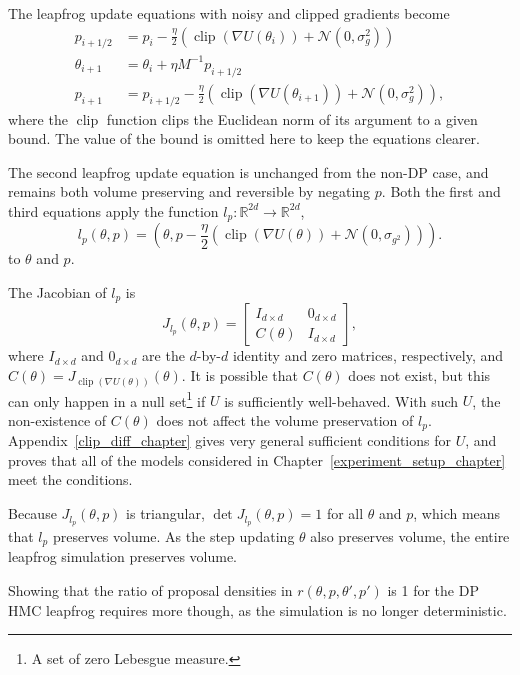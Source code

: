 \documentclass[english,twoside,openright]{HYgraduMLDS}
\newcommand{\R}{\mathbb{R}}
\newcommand{\caln}{{\mathcal{N}}}
\DeclareMathOperator{\clip}{clip}
\begin{document}
The leapfrog update equations with noisy and clipped gradients become
\begin{align*}
  p_{i+1/2} &= p_{i} - \frac{\eta}{2}(\clip(\nabla U(\theta_{i})) + \caln(0, \sigma_{g}^{2})) \\
  \theta_{i+1} &= \theta_{i} + \eta M^{-1}p_{i+1/2} \\
  p_{i+1} &= p_{i+1/2} - \frac{\eta}{2}(\clip(\nabla U(\theta_{i+1})) + \caln(0, \sigma_{g}^{2})),
\end{align*}
where the \(\clip\) function clips the Euclidean norm of its argument to a
given bound. The value of the bound is omitted here to keep the equations
clearer.

The second leapfrog update equation is unchanged from the non-DP case,
and remains both volume preserving and reversible
by negating \(p\). Both the first and third equations apply the function
\(l_{p}\colon \R^{2d}\to \R^{2d}\),
\[
  l_{p}(\theta, p) = \left(\theta, p - \frac{\eta}{2}(\clip(\nabla U(\theta))
    + \caln(0, \sigma_{g^{2}}))\right).
\]
to \(\theta\) and \(p\).

The Jacobian of \(l_{p}\) is
\[
  J_{l_{p}}(\theta, p) =
  \begin{bmatrix}
    I_{d\times d} & 0_{d\times d} \\
    C(\theta) & I_{d\times d}
  \end{bmatrix},
\]
where \(I_{d\times d}\) and \(0_{d\times d}\) are the \(d\)-by-\(d\) identity and
zero matrices, respectively, and \(C(\theta) = J_{\clip(\nabla U(\theta))}(\theta)\).
It is possible that \(C(\theta)\) does not exist, but this can only happen
in a null set\footnote{A set of zero Lebesgue measure.} if \(U\) is sufficiently
well-behaved. With such \(U\), the non-existence of \(C(\theta)\) does not
affect the volume preservation of \(l_{p}\). Appendix~\ref{clip_diff_chapter}
gives very general sufficient conditions for \(U\), and proves that all
of the models considered in Chapter~\ref{experiment_setup_chapter} meet
the conditions.

Because \(J_{l_{p}}(\theta, p)\) is triangular, \(\det J_{l_{p}}(\theta, p) = 1\)
for all \(\theta\) and \(p\), which means that \(l_{p}\) preserves volume.
As the step updating \(\theta\) also preserves volume, the entire leapfrog
simulation preserves volume.

Showing that the ratio of proposal densities in \(r(\theta, p, \theta', p')\)
is 1
for the DP HMC leapfrog requires more though, as the simulation is no longer
deterministic.
\end{document}

